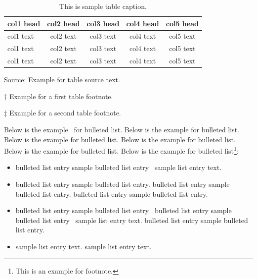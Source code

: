 \documentclass[AMS,STIX2COL]{WileyNJD-v2}
\begin{document}
    \begin{center}
        \begin{table}[t]%
            \centering
            \caption{This is sample table caption.\label{tab2}}%
            \begin{tabular*}{500pt}{@{\extracolsep\fill}lcccc@{\extracolsep\fill}}
                \toprule
                \textbf{col1 head} & \textbf{col2 head} & \textbf{col3 head} & \textbf{col4 head} & \textbf{col5 head}          \\
                \midrule
                col1 text          & col2 text          & col3 text          & col4 text          & col5 text\tnote{$\dagger$}  \\
                col1 text          & col2 text          & col3 text          & col4 text          & col5 text                   \\
                col1 text          & col2 text          & col3 text          & col4 text          & col5 text\tnote{$\ddagger$} \\
                \bottomrule
            \end{tabular*}
            \begin{tablenotes}
                \item Source: Example for table source text.
                \item[$\dagger$] Example for a first table footnote.
                \item[$\ddagger$] Example for a second table footnote.
            \end{tablenotes}
        \end{table}
    \end{center}



    Below is the example~\cite{Rothermel1998,Yoo2007,Schulz2012} for bulleted list. Below is the example for bulleted list. Below is the example for bulleted list. Below is the example for bulleted list. Below is the example for bulleted list. Below is the example for bulleted list\footnote{This is an example for footnote.}:
    \begin{itemize}
        \item bulleted list entry sample bulleted list entry~\cite{Allen2011} sample list entry text.
        \item bulleted list entry sample bulleted list entry. bulleted list entry sample bulleted list entry. bulleted list entry sample bulleted list entry.
        \item bulleted list entry sample bulleted list entry~\cite{Ballen2011} bulleted list entry sample bulleted list entry~\citet{Allen2011} sample list entry text. bulleted list entry sample bulleted list entry.
        \item sample list entry text. sample list entry text.
    \end{itemize}
\end{document}
